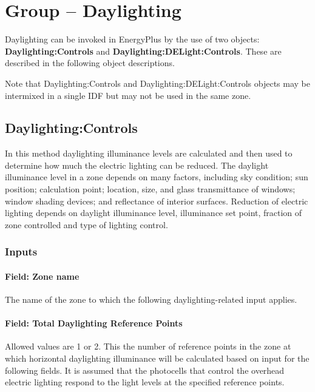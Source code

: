 \section{Group -- Daylighting}\label{group-daylighting}

Daylighting can be invoked in EnergyPlus by the use of two objects: \textbf{Daylighting:Controls} and \textbf{Daylighting:DELight:Controls}. These are described in the following object descriptions.

Note that Daylighting:Controls and Daylighting:DELight:Controls objects may be intermixed in a single IDF but may not be used in the same zone.

\subsection{Daylighting:Controls}\label{daylightingcontrols-000}

In this method daylighting illuminance levels are calculated and then used to determine how much the electric lighting can be reduced. The daylight illuminance level in a zone depends on many factors, including sky condition; sun position; calculation point; location, size, and glass transmittance of windows; window shading devices; and reflectance of interior surfaces. Reduction of electric lighting depends on daylight illuminance level, illuminance set point, fraction of zone controlled and type of lighting control.

\subsubsection{Inputs}\label{inputs-009}

\paragraph{Field: Zone name}\label{field-zone-name-003}

The name of the zone to which the following daylighting-related input applies.

\paragraph{Field: Total Daylighting Reference Points}\label{field-total-daylighting-reference-points}

Allowed values are 1 or 2. This the number of reference points in the zone at which horizontal daylighting illuminance will be calculated based on input for the following fields. It is assumed that the photocells that control the overhead electric lighting respond to the light levels at the specified reference points.

